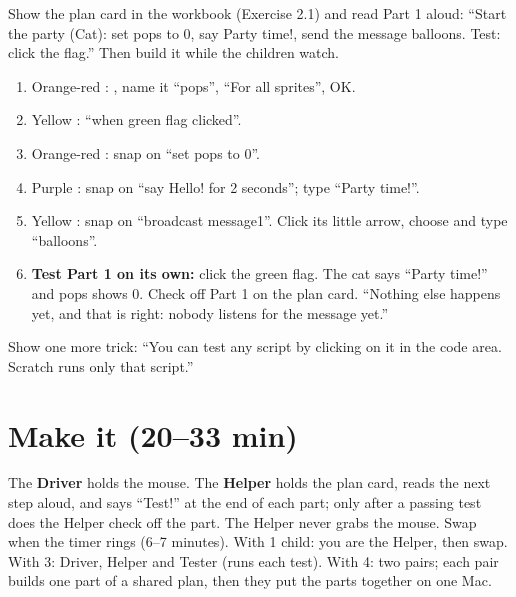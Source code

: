 \begin{workedexample}
Show the plan card in the workbook (Exercise 2.1) and read Part 1 aloud: \enquote{Start the party (Cat): set pops to 0, say Party time!, send the message balloons. Test: click the flag.} Then build it while the children watch.
\begin{enumerate}[leftmargin=1.4em,itemsep=1pt]
  \item Orange-red : , name it \enquote{pops}, \enquote{For all sprites}, OK.
  \item Yellow : \enquote{when green flag clicked}.
  \item Orange-red : snap on \enquote{set pops to 0}.
  \item Purple : snap on \enquote{say Hello! for 2 seconds}; type \enquote{Party time!}.
  \item Yellow : snap on \enquote{broadcast message1}. Click its little arrow, choose  and type \enquote{balloons}.
  \item \textbf{Test Part 1 on its own:} click the green flag. The cat says \enquote{Party time!} and pops shows 0. Check off Part 1 on the plan card. \enquote{Nothing else happens yet, and that is right: nobody listens for the message yet.}
\end{enumerate}
\begin{center}
\begin{scratch}[scale=0.85]
\end{scratch}
\end{center}
Show one more trick: \enquote{You can test any script by clicking on it in the code area. Scratch runs only that script.}
\end{workedexample}

\section{Make it (20--33 min)}
\begin{pairroles}
The \textbf{Driver} holds the mouse. The \textbf{Helper} holds the plan card, reads the next step aloud, and says \enquote{Test!} at the end of each part; only after a passing test does the Helper check off the part. The Helper never grabs the mouse. Swap when the timer rings (6--7 minutes). With 1 child: you are the Helper, then swap. With 3: Driver, Helper and Tester (runs each test). With 4: two pairs; each pair builds one part of a shared plan, then they put the parts together on one Mac.
\end{pairroles}

